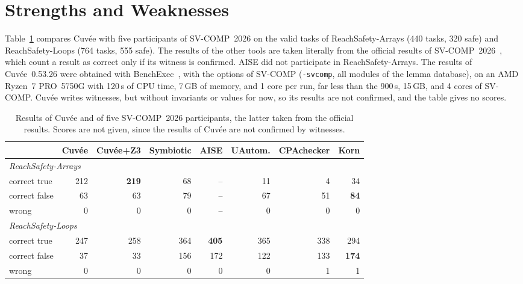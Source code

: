 \documentclass[runningheads]{llncs}
\newcommand{\cuvee}{Cuvée}
\newcommand{\code}[1]{\texttt{#1}}
\begin{document}
\section{Strengths and Weaknesses}

Table~\ref{tab:results} compares \cuvee{} with five participants of SV-COMP~2026 on the valid tasks of
ReachSafety-Arrays (440 tasks, 320 safe) and ReachSafety-Loops (764 tasks, 555 safe). The results of
the other tools are taken literally from the official results of SV-COMP~2026~\cite{svcomp26}, which
count a result as correct only if its witness is confirmed. AISE did not participate in
ReachSafety-Arrays. The results of \cuvee{}~0.53.26 were obtained with BenchExec~\cite{benchexec}, with the options of
SV-COMP (\code{-svcomp}, all modules of the lemma database), on an AMD Ryzen~7 PRO~5750G with 120\,s of CPU
time, 7\,GB of memory, and 1 core per run, far less than the 900\,s, 15\,GB, and 4 cores of SV-COMP.
\cuvee{} writes witnesses, but without invariants or values for now, so its results are not confirmed, and
the table gives no scores.

\begin{table}[t]
\centering
\caption{Results of \cuvee{} and of five SV-COMP~2026 participants, the latter taken from the official
results. Scores are not given, since the results of \cuvee{} are not confirmed by witnesses.}
\label{tab:results}
\setlength{\tabcolsep}{3pt}
\begin{tabular}{lrrrrrrr}
\toprule
& \cuvee{} & \cuvee{}+Z3 & Symbiotic & AISE & UAutom. & CPAchecker & Korn \\
\midrule
\multicolumn{8}{l}{\emph{ReachSafety-Arrays}} \\
\quad correct true  & 212 & \textbf{219} & 68 & -- & 11 & 4 & 34 \\
\quad correct false & 63 & 63 & 79 & -- & 67 & 51 & \textbf{84} \\
\quad wrong & 0 & 0 & 0 & -- & 0 & 0 & 0 \\
\midrule
\multicolumn{8}{l}{\emph{ReachSafety-Loops}} \\
\quad correct true  & 247 & 258 & 364 & \textbf{405} & 365 & 338 & 294 \\
\quad correct false & 37 & 33 & 156 & 172 & 122 & 133 & \textbf{174} \\
\quad wrong & 0 & 0 & 0 & 0 & 0 & 1 & 1 \\
\bottomrule
\end{tabular}
\end{table}
\end{document}
